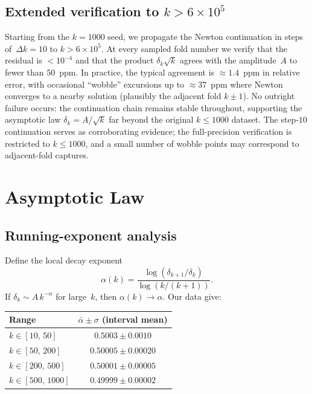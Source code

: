 \documentclass[11pt,a4paper]{article}
\theoremstyle{plain}
\theoremstyle{definition}
\theoremstyle{remark}
\begin{document}
\subsection{Extended verification to
  \texorpdfstring{$k > 6\times 10^5$}{k > 600000}}
\label{sec:extended}
Starting from the $k = 1000$ seed, we propagate the Newton
continuation in steps of~$\Delta k = 10$ to
$k > 6\times 10^5$.  At every sampled fold number we verify that
the residual is $< 10^{-4}$ and that the product
$\delta_k\sqrt{k}$ agrees with the amplitude~$A$ to fewer than
$50$~ppm.  In practice, the typical agreement is
$\approx 1.4$~ppm in relative error, with occasional ``wobble'' excursions up to
$\approx 37$~ppm where Newton converges to a nearby
solution (plausibly the adjacent fold $k \pm 1$).
No outright failure occurs: the continuation chain remains
stable throughout, supporting the asymptotic law
$\delta_k = A/\sqrt{k}$ far beyond the original
$k \le 1000$ dataset.
The step-$10$ continuation serves as corroborating evidence;
the full-precision verification is restricted to $k \le 1000$, and a
small number of wobble points may correspond to adjacent-fold captures.


\section{Asymptotic Law}\label{sec:asymptotic}

\subsection{Running-exponent analysis}\label{sec:running}
Define the local decay exponent
\begin{equation}
  \alpha(k) = \frac{\log(\delta_{k+1}/\delta_k)}
    {\log(k/(k+1))}.
  \label{eq:running}
\end{equation}
If $\delta_k \sim A\,k^{-\alpha}$ for large~$k$, then
$\alpha(k) \to \alpha$.  Our data give:

\begin{center}
\begin{tabular}{@{}lc@{}}
\toprule
Range & $\bar\alpha \pm \sigma$ (interval mean) \\
\midrule
$k \in [10,\,50]$ & $0.5003 \pm 0.0010$ \\
$k \in [50,\,200]$  & $0.50005 \pm 0.00020$ \\
$k \in [200,\,500]$ & $0.50001 \pm 0.00005$ \\
$k \in [500,\,1000]$& $0.49999 \pm 0.00002$ \\
\bottomrule
\end{tabular}
\end{center}
\end{document}
